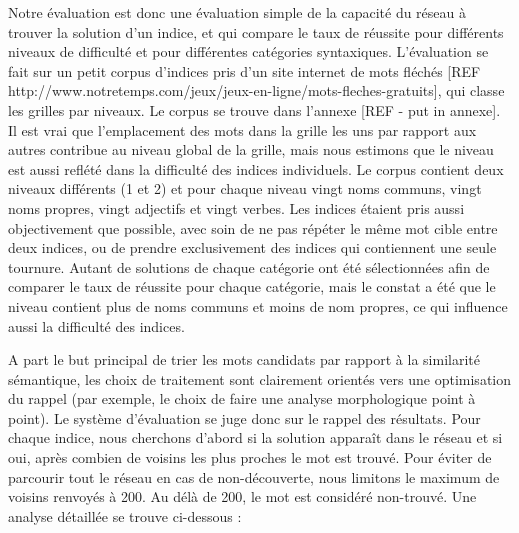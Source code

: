 {Notre évaluation est donc une évaluation simple de la capacité du réseau à trouver la solution d'un indice, et qui compare le taux de réussite pour différents niveaux de difficulté et pour différentes catégories syntaxiques. L'évaluation se fait sur un petit corpus d'indices pris d'un site internet de mots fléchés [REF http://www.notretemps.com/jeux/jeux-en-ligne/mots-fleches-gratuits], qui classe les grilles par niveaux. Le corpus se trouve dans l'annexe [REF - put in annexe]. Il est vrai que l'emplacement des mots dans la grille les uns par rapport aux autres contribue au niveau global de la grille, mais nous estimons que le niveau est aussi reflété dans la difficulté des indices individuels. Le corpus contient deux niveaux différents (1 et 2) et pour chaque niveau vingt noms communs, vingt noms propres, vingt adjectifs et vingt verbes. Les indices étaient pris aussi objectivement que possible, avec soin de ne pas répéter le même mot cible entre deux indices, ou de prendre exclusivement des indices qui contiennent une seule tournure. Autant de solutions de chaque catégorie ont été sélectionnées afin de comparer le taux de réussite pour chaque catégorie, mais le constat a été que le niveau contient plus de noms communs et moins de nom propres, ce qui influence aussi la difficulté des indices.

A part le but principal de trier les mots candidats par rapport à la similarité sémantique, les choix de traitement sont clairement orientés vers une optimisation du rappel (par exemple, le choix de faire une analyse morphologique point à point). Le système d'évaluation se juge donc sur le rappel des résultats. Pour chaque indice, nous cherchons d'abord si la solution apparaît dans le réseau et si oui, après combien de voisins les plus proches le mot est trouvé. Pour éviter de parcourir tout le réseau en cas de non-découverte, nous limitons le maximum de voisins renvoyés à 200. Au délà de 200, le mot est considéré non-trouvé. Une analyse détaillée se trouve ci-dessous :

}
